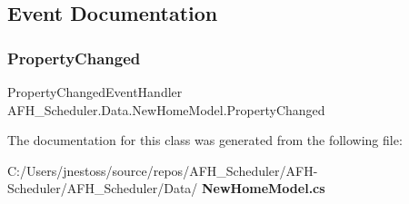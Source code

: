 \subsection{Event Documentation}
\mbox{\label{class_a_f_h___scheduler_1_1_data_1_1_new_home_model_a9f837e8327884315a3d96dc6f4c0c696}} 
\subsubsection{PropertyChanged}
{\footnotesize\ttfamily Property\+Changed\+Event\+Handler A\+F\+H\+\_\+\+Scheduler.\+Data.\+New\+Home\+Model.\+Property\+Changed}



The documentation for this class was generated from the following file\+:\begin{DoxyCompactItemize}
\item 
C\+:/\+Users/jnestoss/source/repos/\+A\+F\+H\+\_\+\+Scheduler/\+A\+F\+H-\/\+Scheduler/\+A\+F\+H\+\_\+\+Scheduler/\+Data/\textbf{ New\+Home\+Model.\+cs}\end{DoxyCompactItemize}
